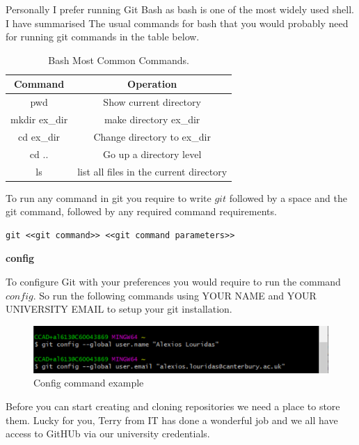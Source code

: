 \documentclass[
]{book}
\begin{document}
Personally I prefer running Git Bash as bash is one of the most widely used shell.
I have summarised The usual commands for bash that you would probably need for running git commands in the table below.

\begin{table}

\caption{\label{tab:unnamed-chunk-5}Bash Most Common Commands.}
\centering
\begin{tabular}[t]{c|c}
\hline
Command & Operation\\
\hline
pwd & Show current directory\\
\hline
mkdir ex\_dir & make directory ex\_dir\\
\hline
cd ex\_dir & Change directory to ex\_dir\\
\hline
cd .. & Go up a directory level\\
\hline
ls & list all files in the current directory\\
\hline
\end{tabular}
\end{table}

To run any command in git you require to write \(git\) followed by a space and the git command, followed by any required command requirements.

\begin{verbatim}
git <<git command>> <<git command parameters>>
\end{verbatim}

\textbf{config}

To configure Git with your preferences you would require to run the command \(config\). So run the following commands using YOUR NAME and YOUR UNIVERSITY EMAIL to setup your git installation.

\begin{figure}

{\centering \includegraphics[width=0.8\linewidth]{images/Git init} 

}

\caption{Config command example}\label{fig:unnamed-chunk-6}
\end{figure}

Before you can start creating and cloning repositories we need a place to store them. Lucky for you, Terry from IT has done a wonderful job and we all have access to GitHUb via our university credentials.
\end{document}
